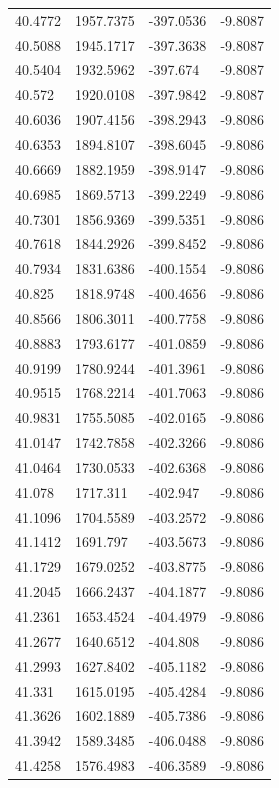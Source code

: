 \begin{table}[H]
\begin{tabular}{llll}
40.4772 & 1957.7375 & -397.0536 & -9.8087 \\
40.5088 & 1945.1717 & -397.3638 & -9.8087 \\
40.5404 & 1932.5962 & -397.674 & -9.8087 \\
40.572 & 1920.0108 & -397.9842 & -9.8087 \\
40.6036 & 1907.4156 & -398.2943 & -9.8086 \\
40.6353 & 1894.8107 & -398.6045 & -9.8086 \\
40.6669 & 1882.1959 & -398.9147 & -9.8086 \\
40.6985 & 1869.5713 & -399.2249 & -9.8086 \\
40.7301 & 1856.9369 & -399.5351 & -9.8086 \\
40.7618 & 1844.2926 & -399.8452 & -9.8086 \\
40.7934 & 1831.6386 & -400.1554 & -9.8086 \\
40.825 & 1818.9748 & -400.4656 & -9.8086 \\
40.8566 & 1806.3011 & -400.7758 & -9.8086 \\
40.8883 & 1793.6177 & -401.0859 & -9.8086 \\
40.9199 & 1780.9244 & -401.3961 & -9.8086 \\
40.9515 & 1768.2214 & -401.7063 & -9.8086 \\
40.9831 & 1755.5085 & -402.0165 & -9.8086 \\
41.0147 & 1742.7858 & -402.3266 & -9.8086 \\
41.0464 & 1730.0533 & -402.6368 & -9.8086 \\
41.078 & 1717.311 & -402.947 & -9.8086 \\
41.1096 & 1704.5589 & -403.2572 & -9.8086 \\
41.1412 & 1691.797 & -403.5673 & -9.8086 \\
41.1729 & 1679.0252 & -403.8775 & -9.8086 \\
41.2045 & 1666.2437 & -404.1877 & -9.8086 \\
41.2361 & 1653.4524 & -404.4979 & -9.8086 \\
41.2677 & 1640.6512 & -404.808 & -9.8086 \\
41.2993 & 1627.8402 & -405.1182 & -9.8086 \\
41.331 & 1615.0195 & -405.4284 & -9.8086 \\
41.3626 & 1602.1889 & -405.7386 & -9.8086 \\
41.3942 & 1589.3485 & -406.0488 & -9.8086 \\
41.4258 & 1576.4983 & -406.3589 & -9.8086 \\

\end{tabular}
\end{table}
